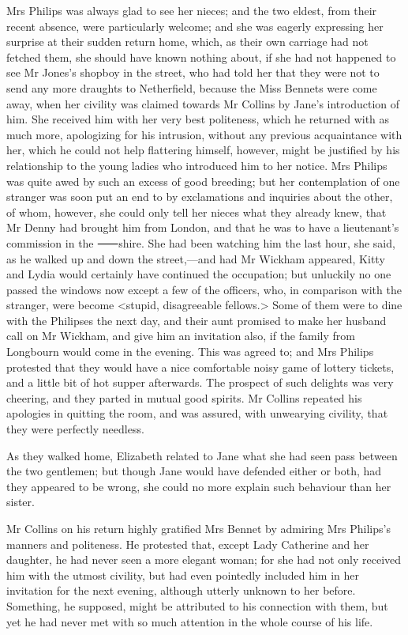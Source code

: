 Mrs Philips was always glad to see her nieces; and the two eldest, from their recent absence, were particularly welcome; and she was eagerly expressing her surprise at their sudden return home, which, as their own carriage had not fetched them, she should have known nothing about, if she had not happened to see Mr Jones's shopboy in the street, who had told her that they were not to send any more draughts to Netherfield, because the Miss Bennets were come away, when her civility was claimed towards Mr Collins by Jane's introduction of him. She received him with her very best politeness, which he returned with as much more, apologizing for his intrusion, without any previous acquaintance with her, which he could not help flattering himself, however, might be justified by his relationship to the young ladies who introduced him to her notice. Mrs Philips was quite awed by such an excess of good breeding; but her contemplation of one stranger was soon put an end to by exclamations and inquiries about the other, of whom, however, she could only tell her nieces what they already knew, that Mr Denny had brought him from London, and that he was to have a lieutenant's commission in the ⸺shire. She had been watching him the last hour, she said, as he walked up and down the street,—and had Mr Wickham appeared, Kitty and Lydia would certainly have continued the occupation; but unluckily no one passed the windows now except a few of the officers, who, in comparison with the stranger, were become <stupid, disagreeable fellows.> Some of them were to dine with the Philipses the next day, and their aunt promised to make her husband call on Mr Wickham, and give him an invitation also, if the family from Longbourn would come in the evening. This was agreed to; and Mrs Philips protested that they would have a nice comfortable noisy game of lottery tickets, and a little bit of hot supper afterwards. The prospect of such delights was very cheering, and they parted in mutual good spirits. Mr Collins repeated his apologies in quitting the room, and was assured, with unwearying civility, that they were perfectly needless.

As they walked home, Elizabeth related to Jane what she had seen pass between the two gentlemen; but though Jane would have defended either or both, had they appeared to be wrong, she could no more explain such behaviour than her sister.

Mr Collins on his return highly gratified Mrs Bennet by admiring Mrs Philips's manners and politeness. He protested that, except Lady Catherine and her daughter, he had never seen a more elegant woman; for she had not only received him with the utmost civility, but had even pointedly included him in her invitation for the next evening, although utterly unknown to her before. Something, he supposed, might be attributed to his connection with them, but yet he had never met with so much attention in the whole course of his life.
